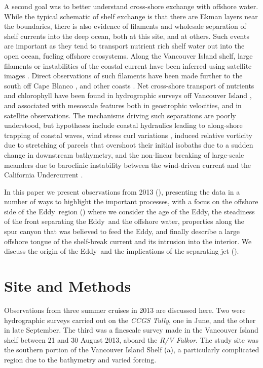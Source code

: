 \documentclass[draft]{agujournal2019}
\newcommand*{\Eddy}{{\sc Eddy}}
\begin{document}
A second goal was to better understand cross-shore exchange with offshore water.  While the typical schematic of shelf exchange is that there are Ekman layers near the boundaries, there is also evidence of filaments and wholesale separation of shelf currents into the deep ocean, both at this site, and at others.  Such events are important as they tend to transport nutrient rich shelf water out into the open ocean, fueling offshore ecosystems.  Along the Vancouver Island shelf, large filaments or instabilities of the coastal current have been inferred using satellite images \cite{ikedaemery84,thomsongower98}.  Direct observations of such filaments have been made further to the south off Cape Blanco \cite{barthetal00}, and other coasts \cite[e.g.]{relvasbarton05}. Net cross-shore transport of nutrients and chlorophyll have been found in hydrographic surveys off Vancouver Island \cite{mackasyelland99}, and associated with mesoscale features both in geostrophic velocities, and in satellite observations.  The mechanisms driving such separations are poorly understood, but hypotheses include coastal hydraulics \cite{dalebarth01} leading to along-shore trapping of coastal waves,  wind stress curl variations \cite{castelaobarth07}, induced relative vorticity due to stretching of parcels that overshoot their initial isobaths due to a sudden change in downstream bathymetry, and the non-linear breaking of large-scale meanders due to baroclinic instability between the wind-driven current and the California Undercurrent \cite{ikedaetal84, batteen97}.

In this paper we present  observations from 2013 (), presenting the data in a number of ways to highlight the important processes, with a focus on the offshore side of the \Eddy\ region () where we consider the age of the \Eddy, the steadiness of the front separating the \Eddy\ and the offshore water, properties along the spur canyon that was believed to feed the \Eddy, and finally describe a large offshore tongue of the shelf-break current and its intrusion into the interior.  We discuss the origin of the \Eddy\ and the implications of the separating jet ().

\section{Site and Methods}
\label{sec:Site}

Observations from three summer cruises in 2013 are discussed here. Two were hydrographic surveys carried out on the \emph{CCGS Tully}, one in June, and the other in late September.  The third was a finescale survey made in the Vancouver Island shelf between 21 and 30 August 2013, aboard the \emph{R/V Falkor}.  The study site was the southern portion of the Vancouver Island Shelf (a), a particularly complicated region due to the bathymetry and varied forcing.
\end{document}
